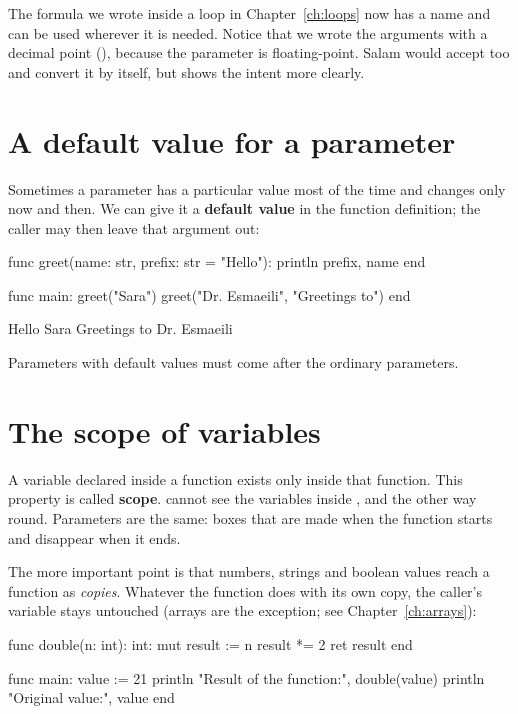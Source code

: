 The formula we wrote inside a loop in Chapter~\ref{ch:loops} now has a name
and can be used wherever it is needed. Notice that we wrote the arguments
with a decimal point (), because the parameter is floating-point.
Salam would accept  too and convert it by itself, but 
shows the intent more clearly.

\section{A default value for a parameter}

Sometimes a parameter has a particular value most of the time and changes
only now and then. We can give it a \textbf{default value} in the function
definition; the caller may then leave that argument out:

\begin{salamcode}
func greet(name: str, prefix: str = "Hello"):
    println prefix, name
end

func main:
    greet("Sara")
    greet("Dr. Esmaeili", "Greetings to")
end
\end{salamcode}

\begin{salamout}
Hello Sara
Greetings to Dr. Esmaeili
\end{salamout}

Parameters with default values must come after the ordinary parameters.

\section{The scope of variables}

A variable declared inside a function exists only inside that function. This
property is called \textbf{scope}.  cannot see the variables
inside , and the other way round. Parameters are the same: boxes
that are made when the function starts and disappear when it ends.

The more important point is that numbers, strings and boolean values reach a
function as \emph{copies}. Whatever the function does with its own copy, the
caller's variable stays untouched (arrays are the exception; see Chapter~\ref{ch:arrays}):

\begin{salamcode}
func double(n: int): int:
    mut result := n
    result *= 2
    ret result
end

func main:
    value := 21
    println "Result of the function:", double(value)
    println "Original value:", value
end
\end{salamcode}

